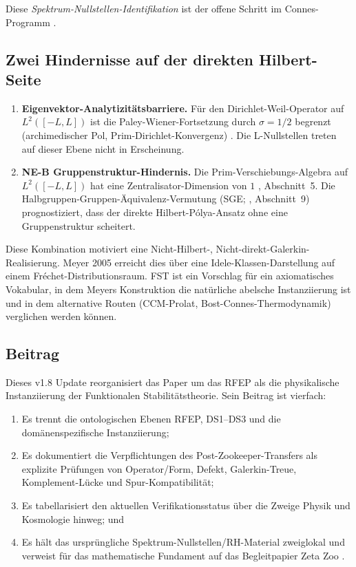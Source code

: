 \documentclass[11pt,a4paper]{article}
\theoremstyle{plain}
\theoremstyle{definition}
\begin{document}
Diese \emph{Spektrum-Nullstellen-Identifikation} ist der offene Schritt im
Connes-Programm \cite{Connes1999,Connes2026,ConnesConsaniMoscovici2025}.

\subsection{Zwei Hindernisse auf der direkten Hilbert-Seite}

\begin{enumerate}[leftmargin=*]
  \item \textbf{Eigenvektor-Analytizitätsbarriere.} Für den Dirichlet-Weil-Operator
    auf $L^2([-L,L])$ ist die Paley-Wiener-Fortsetzung durch $\sigma = 1/2$ begrenzt
    (archimedischer Pol, Prim-Dirichlet-Konvergenz) \cite{AnalyticKernelV2,C2LayerStatus}.
    Die L-Nullstellen treten auf dieser Ebene nicht in Erscheinung.
  \item \textbf{NE-B Gruppenstruktur-Hindernis.} Die Prim-Verschiebungs-Algebra
    auf $L^2([-L,L])$ hat eine Zentralisator-Dimension von $1$
    \cite{Geiger2026RHII}, Abschnitt~5. Die Halbgruppen-Gruppen-Äquivalenz-Vermutung
    (SGE; \cite{MathMaster}, Abschnitt~9) prognostiziert, dass der direkte
    Hilbert-P\'olya-Ansatz ohne eine Gruppenstruktur scheitert.
\end{enumerate}

Diese Kombination motiviert eine Nicht-Hilbert-, Nicht-direkt-Galerkin-Realisierung.
Meyer 2005 erreicht dies über eine Idele-Klassen-Darstellung auf einem
Fr\'echet-Distributionsraum. FST ist ein Vorschlag für ein axiomatisches Vokabular,
in dem Meyers Konstruktion die natürliche abelsche Instanziierung ist und in dem
alternative Routen (CCM-Prolat, Bost-Connes-Thermodynamik) verglichen werden können.

\subsection{Beitrag}

Dieses v1.8 Update reorganisiert das Paper um das RFEP als die physikalische
Instanziierung der Funktionalen Stabilitätstheorie. Sein Beitrag ist vierfach:
\begin{enumerate}[leftmargin=*]
  \item Es trennt die ontologischen Ebenen RFEP, DS1--DS3 und die domänenspezifische Instanziierung;
  \item Es dokumentiert die Verpflichtungen des Post-Zookeeper-Transfers als explizite Prüfungen
    von Operator/Form, Defekt, Galerkin-Treue, Komplement-Lücke und Spur-Kompatibilität;
  \item Es tabellarisiert den aktuellen Verifikationsstatus über die Zweige Physik und Kosmologie hinweg; und
  \item Es hält das ursprüngliche Spektrum-Nullstellen/RH-Material zweiglokal und
    verweist für das mathematische Fundament auf das Begleitpapier Zeta Zoo \cite{ZetaZooMaster}.
\end{enumerate}
\end{document}
